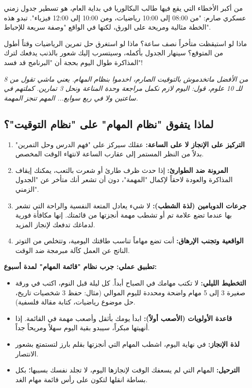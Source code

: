 \documentclass[12pt,a4paper]{book}
\newcommand{\quoteAr}[1]{%
	\begin{myquote}
		\itshape #1
	\end{myquote}
}
\begin{document}
من أكبر الأخطاء التي يقع فيها طالب البكالوريا في بداية العام، هو تسطير جدول زمني عسكري صارم: "من 08:00 إلى 10:00 رياضيات، ومن 10:00 إلى 12:00 فيزياء". تبدو هذه الخطة مثالية ومريحة على الورق، لكنها في الواقع "وصفة سريعة للإحباط". 

ماذا لو استيقظت متأخراً نصف ساعة؟ ماذا لو استغرق حل تمرين الرياضيات وقتاً أطول من المتوقع؟ سينهار الجدول بأكمله، وسيتسرب إليك شعور بالذنب يدفعك لترك المذاكرة طوال اليوم بحجة أن "البرنامج قد فسد"!

\quoteAr{من الأفضل ماتخدموش بالتوقيت الصارم، اخدموا بنظام المهام. يعني ماشي تقول من 8 للـ 10 علوم، قول: اليوم لازم نكمل مراجعة وحدة المناعة ونحل 3 تمارين. كملتهم في ساعتين ولا في ربع سوايع... المهم تنجز المهمة.}

\subsection{لماذا يتفوق "نظام المهام" على "نظام التوقيت"؟}
\begin{enumerate}
	\item \textbf{التركيز على الإنجاز لا على الساعة:} عقلك سيركز على "فهم الدرس وحل التمرين" بدلاً من النظر المستمر إلى عقارب الساعة لانتهاء الوقت المخصص.
	\item \textbf{المرونة ضد الطوارئ:} إذا حدث ظرف طارئ أو شعرت بالتعب، يمكنك إيقاف المذاكرة والعودة لاحقاً لإكمال "المهمة"، دون أن تشعر أنك متأخر عن "الجدول الزمني".
	\item \textbf{جرعات الدوبامين (لذة الشطب):} لا شيء يعادل المتعة النفسية والراحة التي تشعر بها عندما تضع علامة تم أو تشطب مهمة أنجزتها من قائمتك. إنها مكافأة فورية لدماغك تدفعك لإنجاز المزيد.
	\item \textbf{الواقعية وتجنب الإرهاق:} أنت تضع مهاماً تناسب طاقتك اليومية، وتتخلص من التوتر الناتج عن العمل كآلة مبرمجة ضد الوقت.
\end{enumerate}

\begin{exercise}
	\textbf{تطبيق عملي: جرب نظام "قائمة المهام" لمدة أسبوع:}
	\begin{itemize}
		\item \textbf{التخطيط الليلي:} لا تكتب مهامك في الصباح أبداً. كل ليلة قبل النوم، اكتب في ورقة صغيرة 3 إلى 5 مهام واضحة ومحددة لليوم الموالي (مثال: حفظ 3 شخصيات تاريخ، حل موضوع رياضيات، كتابة مقالة فلسفية).
		\item \textbf{قاعدة الأولويات (الأصعب أولاً):} ابدأ يومك بأثقل وأصعب مهمة في القائمة. إذا أنهيتها مبكراً، سيبدو بقية اليوم سهلاً ومريحاً جداً.
		\item \textbf{لذة الإنجاز:} في نهاية اليوم، اشطب المهام التي أنجزتها بقلم بارز لتستمتع بشعور الانتصار.
		\item \textbf{الترحيل:} المهام التي لم يسعفك الوقت لإنجازها اليوم، لا تجلد نفسك بسببها؛ بكل بساطة انقلها لتكون على رأس قائمة مهام الغد.
	\end{itemize}
\end{exercise}
\end{document}
